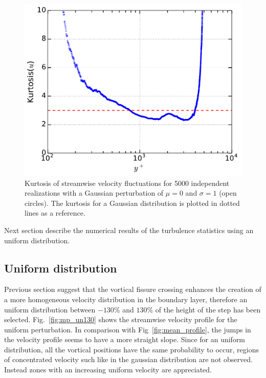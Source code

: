 \documentclass[aps,reprint,amsmath,amssymb,pra,floatfix]{revtex4-1}%
\begin{document}
\begin{figure}[tb] 
\includegraphics[scale=0.46]{figures/kurtosis_5000_assembles_gauss100}
\caption{\label{fig:kurtgaus100} Kurtosis of streamwise velocity fluctuations for 5000 independent realizations with a Gaussian perturbation of $\mu=0$ and $\sigma=1$ (open circles). The kurtosis for a Gaussian distribution is plotted in dotted lines as a reference.}
\end{figure}
Next section describe the numerical results of the turbulence statistics using an uniform distribution.
\subsection{Uniform distribution}
Previous section suggest that the vortical fissure crossing enhances the creation of a more homogeneous velocity distribution in the boundary layer, therefore an uniform distribution between $-130\%$ and $130\%$ of the height of the step has been selected. Fig.~\ref{fig:mp_un130}  shows the streamwise velocity profile for the uniform perturbation. In comparison with Fig~\ref{fig:mean_profile}, the jumps in the velocity profile seems to have a more straight slope. Since for an uniform distribution, all the vortical positions have the same probability to occur, regions of concentrated velocity such like in the gaussian distribution are not observed. Instead zones with an increasing uniform velocity are appreciated.   
\end{document}
